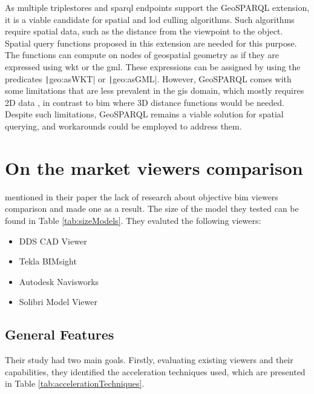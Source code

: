 As multiple triplestores and \ac{sparql} endpoints support the GeoSPARQL extension, it is a viable candidate for spatial and \ac{lod} culling algorithms. Such algorithms require spatial data, such as the distance from the viewpoint to the object. Spatial query functions proposed in this extension are needed for this purpose. The functions can compute on nodes of geospatial geometry as if they are expressed using \ac{wkt} or the \ac{gml}. These expressions can be assigned by using the predicates \texttt|geo:asWKT| or \texttt|geo:asGML|. However, GeoSPARQL comes with some limitations that are less prevalent in the \ac{gis} domain, which mostly requires 2D data \parencite{perry2012ogc}, in contrast to \ac{bim} where 3D distance functions would be needed. Despite such limitations, GeoSPARQL remains a viable solution for spatial querying, and workarounds could be employed to address them.

\section{On the market viewers comparison}
\cite{Johansson2015} mentioned in their paper the lack of research about objective \ac{bim} viewers comparison and made one as a result. The size of the model they tested can be found in Table \ref{tab:sizeModels}. They evaluted the following viewers:
\begin{itemize}
    \item DDS CAD Viewer
    \item Tekla BIMsight
    \item Autodesk Navisworks
    \item Solibri Model Viewer
\end{itemize}

\subsection{General Features}
Their study had two main goals. Firstly, evaluating existing viewers and their capabilities, they identified the acceleration techniques used, which are presented in Table \ref{tab:accelerationTechniques}.

